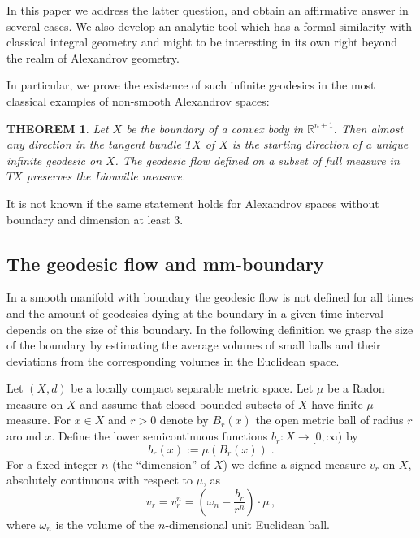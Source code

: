 \documentclass[12pt,leqno]{amsart}
\numberwithin{equation}{section}
\newtheorem{thm}{THEOREM}[section]
\theoremstyle{definition}
\theoremstyle{remark}
\begin{document}
In this paper we address the latter question, and obtain an affirmative answer in several cases.  
We also develop an analytic tool which has a formal similarity with  classical integral geometry 
and might to be interesting in its own right beyond the realm of Alexandrov geometry.

In particular, we prove the existence of such  infinite geodesics in the most classical examples of non-smooth Alexandrov spaces:

\begin{thm} \label{thmfirst}
Let $X$ be the boundary of a convex body in $\mathbb R^{n+1}$.
Then almost any direction in the tangent bundle $TX$ of $X$
is the starting direction of a unique  infinite geodesic on $X$.
The geodesic flow defined on a subset  of full  measure in $TX$ preserves the Liouville measure.
\end{thm}

It is not known if the same statement holds for Alexandrov spaces without boundary and dimension at least 3.

 \subsection{The geodesic flow and mm-boundary}
In a smooth manifold with boundary the geodesic flow is not defined for all times and the amount of geodesics dying at the boundary in a given time interval depends on the size  of this boundary.   
In the following definition we grasp the size of the boundary by estimating the average volumes of small balls and their deviations from the corresponding  volumes in the Euclidean space.

Let $(X,d)$ be a locally compact separable metric space. Let $\mu$ be   a  Radon  measure on $X$ and assume that closed bounded subsets
of $X$ have finite $\mu$-measure.
For $x\in X$ and $r>0$
denote by $B_r (x)$ the open metric ball of radius $r$ around  $x$. Define the lower semicontinuous functions $b_r:X\to [0,\infty )$ by
\begin{equation}
 b_r(x):=\mu (B_r (x)) \; .
 \end{equation}
For a fixed integer $n$ (the ``dimension'' of $X$)
 we define a signed measure $v_r$ on $X$, absolutely continuous with respect to $\mu$,   as
\begin{equation} \label{eq:first}
 v_r=v^n_r = (\omega _n - \frac {b_r} {r^n} )\cdot \mu \, ,
\end{equation}
where $\omega _n$ is the volume of the $n$-dimensional unit Euclidean ball.  
\end{document}
